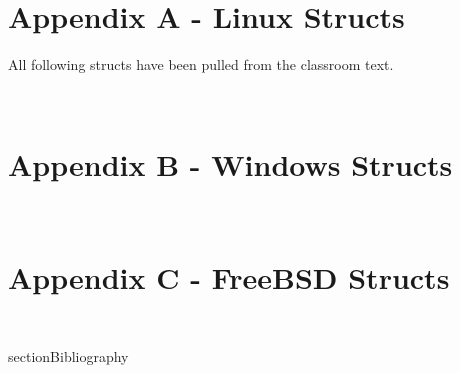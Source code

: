\documentclass[10pt,letterpaper,onecolumn,draftclsnofoot]{IEEEtran}
\begin{document}
\section{Appendix A - Linux Structs}
All following structs have been pulled from the classroom text. \cite{robertlove2010}
\begin{lstlisting}


\end{lstlisting}

\section{Appendix B - Windows Structs}
\begin{lstlisting}


\end{lstlisting}
\section{Appendix C - FreeBSD Structs}
\begin{lstlisting}


\end{lstlisting}

section{Bibliography}


\end{document}
